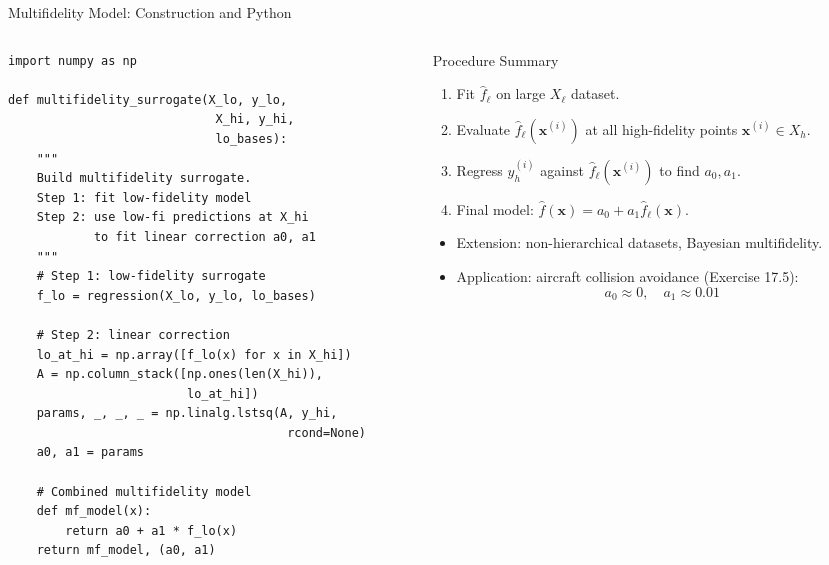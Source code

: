 \documentclass[aspectratio=169,10pt]{beamer}
\newcommand{\vx}{\mathbf{x}}
\newcommand{\hatf}{\hat{f}}
\begin{document}
\begin{frame}[fragile]{Multifidelity Model: Construction and Python}
  \begin{columns}[T]
    \begin{column}{0.52\textwidth}
\begin{lstlisting}[style=python, basicstyle=\ttfamily\tiny, caption={Linear multifidelity surrogate}]
import numpy as np

def multifidelity_surrogate(X_lo, y_lo,
                             X_hi, y_hi,
                             lo_bases):
    """
    Build multifidelity surrogate.
    Step 1: fit low-fidelity model
    Step 2: use low-fi predictions at X_hi
            to fit linear correction a0, a1
    """
    # Step 1: low-fidelity surrogate
    f_lo = regression(X_lo, y_lo, lo_bases)

    # Step 2: linear correction
    lo_at_hi = np.array([f_lo(x) for x in X_hi])
    A = np.column_stack([np.ones(len(X_hi)),
                         lo_at_hi])
    params, _, _, _ = np.linalg.lstsq(A, y_hi,
                                       rcond=None)
    a0, a1 = params

    # Combined multifidelity model
    def mf_model(x):
        return a0 + a1 * f_lo(x)
    return mf_model, (a0, a1)
\end{lstlisting}
    \end{column}
    \begin{column}{0.45\textwidth}
      \vspace{6pt}
      \begin{block}{Procedure Summary}
        \begin{enumerate}
          \item Fit $\hatf_\ell$ on large $X_\ell$ dataset.
          \item Evaluate $\hatf_\ell(\vx^{(i)})$ at all high-fidelity points $\vx^{(i)} \in X_h$.
          \item Regress $y_h^{(i)}$ against $\hatf_\ell(\vx^{(i)})$ to find $a_0, a_1$.
          \item Final model: $\hatf(\vx) = a_0 + a_1 \hatf_\ell(\vx)$.
        \end{enumerate}
      \end{block}
      \begin{itemize}
        \item Extension: non-hierarchical datasets, Bayesian multifidelity.
        \item Application: aircraft collision avoidance (Exercise 17.5):
          \[
            a_0 \approx 0,\quad a_1 \approx 0.01
          \]
      \end{itemize}
    \end{column}
  \end{columns}
\end{frame}
\end{document}
